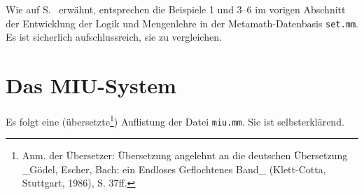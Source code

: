 Wie auf S.~\pageref{exampleref} erwähnt, entsprechen die Beispiele 1 und 3--6 im vorigen Abschnitt der Entwicklung der Logik und Mengenlehre in der Metamath-Datenbasis \texttt{set.mm}. Es ist sicherlich aufschlussreich, sie zu vergleichen. 


\chapter{Das MIU-System}
\label{MIU}

Es folgt eine (übersetzte\footnote{Anm. der Übersetzer: Übersetzung angelehnt an die deutschen Übersetzung _Gödel, Escher, Bach: ein Endloses Geflochtenes Band_ (Klett-Cotta, Stuttgart, 1986), S. 37ff.}) Auflistung der Datei \texttt{miu.mm}.  Sie ist selbsterklärend.


